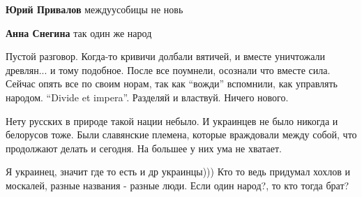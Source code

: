 \begin{itemize}
\begin{itemize}
\textbf{Юрий Привалов} междуусобицы не новь

\textbf{Анна Снегина} так один же народ
\end{itemize} %


Пустой разговор. Когда-то кривичи долбали вятичей, и вместе уничтожали
древлян... и тому подобное. После все поумнели, осознали что вместе сила.
Сейчас опять все по своим норам, так как \enquote{вожди} вспомнили, как управлять
народом. \enquote{Divide et impera}. Разделяй и властвуй. Ничего нового.


Нету русских в природе такой нации небыло. И украинцев не было никогда и
белорусов тоже. Были славянские племена, которые враждовали между собой, что
продолжают делать и сегодня. На большее у них ума не хватает.


Я украинец, значит где то есть и др украинцы)))
Кто то ведь придумал хохлов и москалей, разные названия - разные люди.
Если один народ?, то кто тогда брат?

\end{itemize} %
